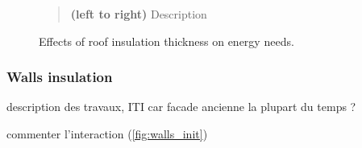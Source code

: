 \documentclass[11pt]{article}
\begin{document}
\begin{figure}[ht]
                \caption{\label{fig:roof_init} Effects of roof insulation thickness on energy needs.}
                \begin{quote}
                    \vspace{-2mm}
                    \small\noindent
                    \textbf{(left to right)} Description
                  \end{quote}
            \end{figure}


        \subsubsection{Walls insulation} %
        \label{ssub:walls_insulation}

            description des travaux, ITI car facade ancienne la plupart du temps ? 

            commenter l'interaction (\ref{fig:walls_init})
\end{document}
